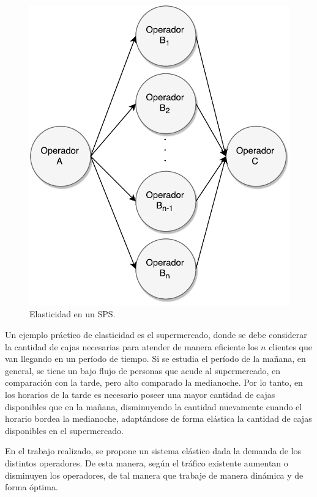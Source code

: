 \begin{figure}[!ht]
	\centering
	\includegraphics[scale=0.55]{images/Elasticidad.pdf}
	\caption{Elasticidad en un SPS.}
	\label{fig:elasticidad}
\end{figure}

Un ejemplo práctico de elasticidad es el supermercado, donde se debe considerar la cantidad de cajas necesarias para atender de manera eficiente los $n$ clientes que van llegando en un período de tiempo. Si se estudia el período de la mañana, en general, se tiene un bajo flujo de personas que acude al supermercado, en comparación con la tarde, pero alto comparado la medianoche. Por lo tanto, en los horarios de la tarde es necesario poseer una mayor cantidad de cajas disponibles que en la mañana, disminuyendo la cantidad nuevamente cuando el horario bordea la medianoche, adaptándose de forma elástica la cantidad de cajas disponibles en el supermercado.

En el trabajo realizado, se propone un sistema elástico dada la demanda de los distintos operadores. De esta manera, según el tráfico existente aumentan o disminuyen los operadores, de tal manera que trabaje de manera dinámica y de forma óptima.

